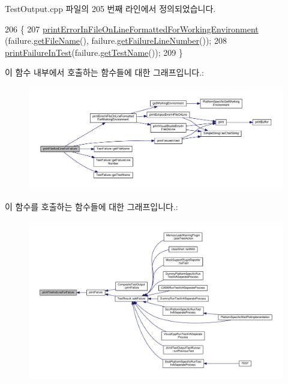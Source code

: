 Test\+Output.\+cpp 파일의 205 번째 라인에서 정의되었습니다.


\begin{DoxyCode}
206 \{
207     \hyperlink{class_test_output_a56ae5964123fc91c7149a8274aa22db9}{printErrorInFileOnLineFormattedForWorkingEnvironment}
      (failure.\hyperlink{class_test_failure_ac74fa65c497d9a175304a14ffafcaa1a}{getFileName}(), failure.\hyperlink{class_test_failure_a9d41f8ad9667ed1f471676d49a655ec7}{getFailureLineNumber}());
208     \hyperlink{class_test_output_a1748d410d65b95596df95234742258a3}{printFailureInTest}(failure.\hyperlink{class_test_failure_a02da3865d8c38e5fd122a08a5e23773e}{getTestName}());
209 \}
\end{DoxyCode}


이 함수 내부에서 호출하는 함수들에 대한 그래프입니다.\+:
\nopagebreak
\begin{figure}[H]
\begin{center}
\leavevmode
\includegraphics[width=350pt]{class_test_output_a1d78706f5181a464f5fafb178d231be9_cgraph}
\end{center}
\end{figure}




이 함수를 호출하는 함수들에 대한 그래프입니다.\+:
\nopagebreak
\begin{figure}[H]
\begin{center}
\leavevmode
\includegraphics[width=350pt]{class_test_output_a1d78706f5181a464f5fafb178d231be9_icgraph}
\end{center}
\end{figure}



